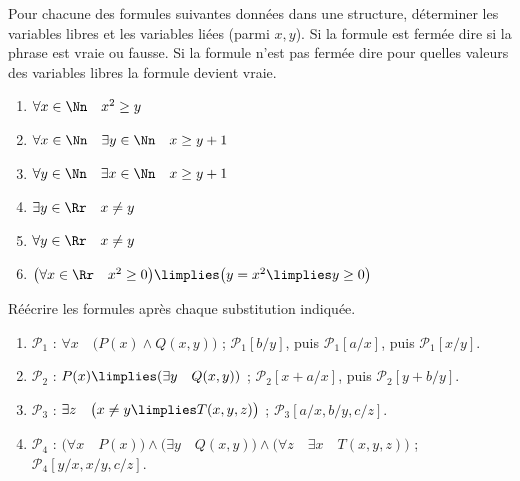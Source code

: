 \documentclass[11pt,class=report,crop=false]{standalone}
\begin{document}
\begin{exercicecours}
Pour chacune des formules suivantes données dans une structure, déterminer les variables libres et les variables liées (parmi $x,y$). Si la formule est fermée dire si la phrase est vraie ou fausse. Si la formule n'est pas fermée dire pour quelles valeurs des variables libres la formule devient vraie.
\begin{enumerate}
	\item $\forall x \in \Nn \quad x^2 \ge y$
	
	\item $\forall x \in \Nn \quad \exists y \in \Nn \quad x \ge y + 1$
	
	\item $\forall y \in \Nn \quad \exists x \in \Nn \quad x \ge y + 1$
	
	\item $\exists y \in \Rr \quad x \neq y$
	
	\item $\forall y \in \Rr \quad x \neq y$
	
	\item $\big( \forall x \in \Rr \quad x^2 \ge 0 \big) \limplies \big( y = x^2 \limplies y \ge 0 \big)$
\end{enumerate}
\end{exercicecours}


\begin{exercicecours}
Réécrire les formules après chaque substitution indiquée.
\begin{enumerate}
	\item $\mathcal{P}_1$ : $\forall x \quad \big( P(x) \land Q(x,y) \big)$ ;
	$\mathcal{P}_1[b/y]$, puis $\mathcal{P}_1[a/x]$, puis $\mathcal{P}_1[x/y]$.
	
	\item $\mathcal{P}_2$ : $P(x) \limplies (\exists y \quad Q(x,y))$ ;
	$\mathcal{P}_2[x+a/x]$, puis $\mathcal{P}_2[y+b/y]$.
	
	\item $\mathcal{P}_3$ : $\exists z \quad \big( x \neq y \limplies T(x,y,z) \big)$ ;
	$\mathcal{P}_3[a/x,b/y,c/z]$.
	
	\item $\mathcal{P}_4$ : $\big( \forall x \quad P(x) \big) \land \big( \exists y \quad Q(x,y) \big) \land \big( \forall z \quad \exists x \quad T(x,y,z) \big)$ ;
	$\mathcal{P}_4[y/x,x/y,c/z]$.
\end{enumerate}
\end{exercicecours}
\end{document}
